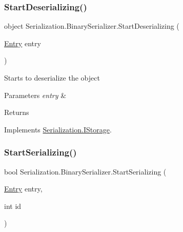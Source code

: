 \subsubsection{\texorpdfstring{Start\+Deserializing()}{StartDeserializing()}}
{\footnotesize\ttfamily object Serialization.\+Binary\+Serializer.\+Start\+Deserializing (\begin{DoxyParamCaption}\item[{\hyperlink{class_serialization_1_1_entry}{Entry}}]{entry }\end{DoxyParamCaption})\hspace{0.3cm}{\ttfamily [inline]}}



Starts to deserialize the object 


\begin{DoxyParams}{Parameters}
{\em entry} & \\
\hline
\end{DoxyParams}
\begin{DoxyReturn}{Returns}

\end{DoxyReturn}


Implements \hyperlink{interface_serialization_1_1_i_storage_a90aa19f79a51acf057f20da842ef09b3}{Serialization.\+I\+Storage}.

\mbox{\label{class_serialization_1_1_binary_serializer_aef0fdf4b432dfe09b1bf9c11786dee58}} 
\subsubsection{\texorpdfstring{Start\+Serializing()}{StartSerializing()}\hspace{0.1cm}{\footnotesize\ttfamily [1/2]}}
{\footnotesize\ttfamily bool Serialization.\+Binary\+Serializer.\+Start\+Serializing (\begin{DoxyParamCaption}\item[{\hyperlink{class_serialization_1_1_entry}{Entry}}]{entry,  }\item[{int}]{id }\end{DoxyParamCaption})\hspace{0.3cm}{\ttfamily [inline]}}



